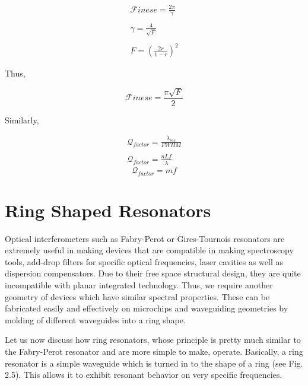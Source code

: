 \begin{align*}
{\mathcal F}inese = \frac{2 \pi}{\gamma} \\ 
\\
{\mathcal \gamma} = \frac{4}{\sqrt{F}} \\
\\
F = (\frac{2r}{1-r})^{2} 
\end{align*}

Thus,

\begin{equation}
{\mathcal F}inese = \frac{\pi \sqrt{F}}{2}
\end{equation}

Similarly, 

\begin{align*}
{\mathcal Q}_{factor} = \frac{\lambda_{res}}{FWHM} \\ 
\\
{\mathcal Q}_{factor} = \frac{nLf}{\lambda}
\end{align*}
\begin{equation}
{\mathcal Q}_{factor} = m f
\end{equation}


\section{Ring Shaped Resonators}
Optical interferometers such as Fabry-Perot or Gires-Tournois resonators are extremely useful in making devices that are compatible in making spectroscopy tools, add-drop filters for specific optical frequencies, laser cavities as well as dispersion compensators. Due to their free space structural design, they are quite incompatible with planar integrated technology. Thus, we require another geometry of devices which have similar spectral properties. These can be fabricated easily and effectively on microchips and waveguiding geometries by molding of different waveguides into a ring shape.

Let us now discuss how ring resonators, whose principle is pretty much similar to the Fabry-Perot resonator and are more simple to make, operate. Basically, a ring resonator is a simple waveguide which is turned in to the shape of a ring (see Fig. 2.5). This allows it to exhibit resonant behavior on very specific frequencies.


